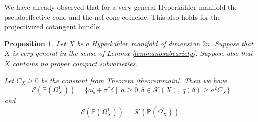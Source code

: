 \documentclass[11pt]{article}
\let\mathcal\mathscr
\theoremstyle{plain}
\newtheorem{proposition}[theorem]{Proposition}
\theoremstyle{definition}
\newcommand{\PP}{\ensuremath{\mathbb{P}}}
\begin{document}
We have already observed that for a very general Hyperkähler manifold
the pseudoeffective cone and the nef cone coincide.
This also holds for the projectivized cotangent bundle:

\begin{proposition} \label{propositionpseffcone}
Let $X$ be a Hyperkähler manifold of dimension $2n$. Suppose that~$X$ is very general in the sense of Lemma \ref{lemmanosubvariety}.
Suppose also that
$X$ contains no proper compact subvarieties.

Let $C_X \geq 0$ be the constant from Theorem \ref{theoremmain}.
Then we have
\begin{equation} \label{formulapseffcone}
\mathcal{E}(\PP(\Omega_X^1))=\{ a\zeta+\pi^* \delta \mid\ a\geq 0, \delta\in \overline{\mathcal{K}(X)},\ q(\delta)\geq a^2 C_X \}
\end{equation}
and 
\[
\mathcal{E}(\PP(\Omega_X^1))=\overline{\mathcal{K}(\PP(\Omega_X^1))}.
\]
\end{proposition}
\end{document}
